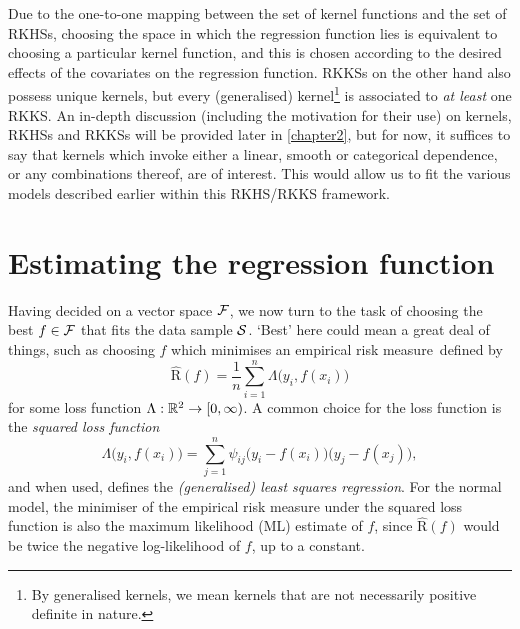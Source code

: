 \documentclass[11pt,twoside,openright,showframe]{report}
\begin{document}
Due to the one-to-one mapping between the set of kernel functions and the set of RKHSs, choosing the space in which the regression function lies is equivalent to choosing a particular kernel function, and this is chosen according to the desired effects of the covariates on the regression function.
RKKSs on the other hand also possess unique kernels, but every (generalised) kernel\footnote{By generalised kernels, we mean kernels that are not necessarily positive definite in nature.} is associated to \emph{at least} one RKKS.
An in-depth discussion (including the motivation for their use) on kernels, RKHSs and RKKSs will be provided later in \cref{chapter2}, but for now, it suffices to say that kernels which invoke either a linear, smooth or categorical dependence, or any combinations thereof, are of interest.
This would allow us to fit the various models described earlier within this RKHS/RKKS framework.

\section{Estimating the regression function}

Having decided on a vector space ${\mathcal F}$, we now turn to the task of choosing the best $f \in {\mathcal F}$ that fits the data sample ${\mathcal S}$.
`Best' here could mean a great deal of things, such as choosing $f$ which minimises an empirical risk measure\footnotemark~defined by
%
\begin{equation*}
  \hat{\text{R}}(f) = \frac{1}{n} \sum_{i=1}^n \Lambda\big( y_i, f(x_i) \big) 
\end{equation*}
%
for some loss function $\Lambda:\mathbb{R}^2 \to [0,\infty)$.
A common choice for the loss function is the \emph{squared loss function}
%
\[
  \Lambda\big(y_i,f(x_i)\big) = \sum_{j=1}^n \psi_{ij} \big(y_i - f(x_i)\big)\big(y_j - f(x_j)\big),
\]
%
and when used, defines the \emph{(generalised) least squares regression}.
For the normal model, the minimiser of the empirical risk measure under the squared loss function is also the maximum likelihood (ML) estimate of $f$, since $ \hat{\text{R}}(f)$ would be twice the negative log-likelihood of $f$, up to a constant.

\end{document}

